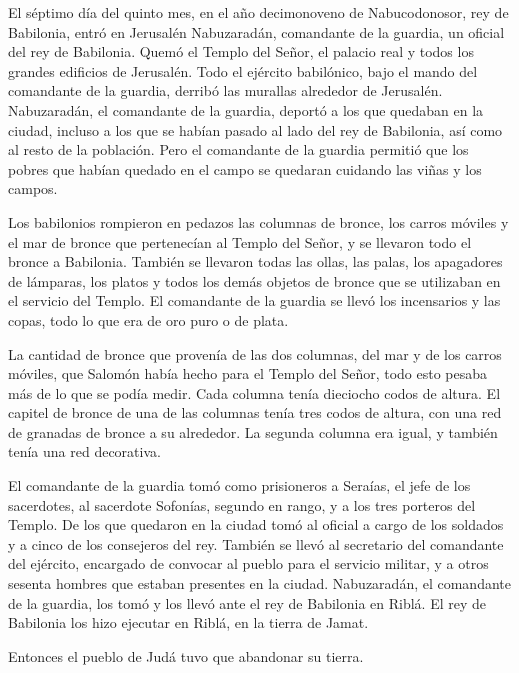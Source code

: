  El séptimo día del quinto mes, en el año decimonoveno de
Nabucodonosor, rey de Babilonia, entró en Jerusalén Nabuzaradán,
comandante de la guardia, un oficial del rey de Babilonia. 
Quemó el Templo del Señor, el palacio real y todos los grandes edificios
de Jerusalén.  Todo el ejército babilónico, bajo el mando
del comandante de la guardia, derribó las murallas alrededor de
Jerusalén.  Nabuzaradán, el comandante de la guardia,
deportó a los que quedaban en la ciudad, incluso a los que se habían
pasado al lado del rey de Babilonia, así como al resto de la población.
 Pero el comandante de la guardia permitió que los pobres
que habían quedado en el campo se quedaran cuidando las viñas y los
campos.

 Los babilonios rompieron en pedazos las columnas de
bronce, los carros móviles y el mar de bronce que pertenecían al Templo
del Señor, y se llevaron todo el bronce a Babilonia. 
También se llevaron todas las ollas, las palas, los apagadores de
lámparas, los platos y todos los demás objetos de bronce que se
utilizaban en el servicio del Templo.  El comandante de la
guardia se llevó los incensarios y las copas, todo lo que era de oro
puro o de plata.

 La cantidad de bronce que provenía de las dos columnas,
del mar y de los carros móviles, que Salomón había hecho para el Templo
del Señor, todo esto pesaba más de lo que se podía medir. 
Cada columna tenía dieciocho codos de altura. El capitel de bronce de
una de las columnas tenía tres codos de altura, con una red de granadas
de bronce a su alrededor. La segunda columna era igual, y también tenía
una red decorativa.

 El comandante de la guardia tomó como prisioneros a
Seraías, el jefe de los sacerdotes, al sacerdote Sofonías, segundo en
rango, y a los tres porteros del Templo.  De los que
quedaron en la ciudad tomó al oficial a cargo de los soldados y a cinco
de los consejeros del rey. También se llevó al secretario del comandante
del ejército, encargado de convocar al pueblo para el servicio militar,
y a otros sesenta hombres que estaban presentes en la ciudad.
 Nabuzaradán, el comandante de la guardia, los tomó y los
llevó ante el rey de Babilonia en Riblá.  El rey de
Babilonia los hizo ejecutar en Riblá, en la tierra de Jamat.

Entonces el pueblo de Judá tuvo que abandonar su tierra.

